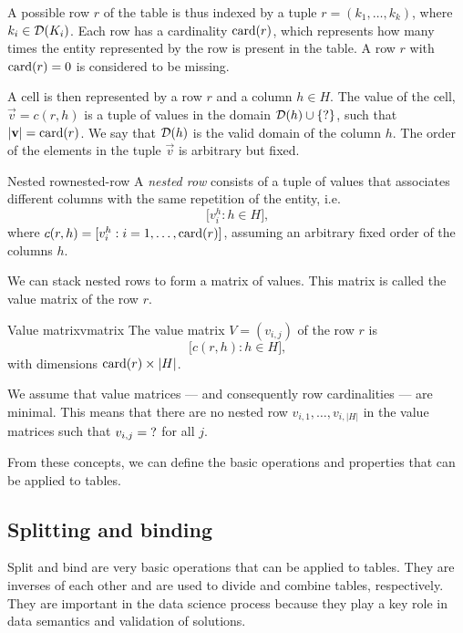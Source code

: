 A possible row $r$ of the table is thus indexed by a tuple $r = (k_1, \dots,
k_k)$, where $k_i \in \domainof{K_i}$.  Each row has a cardinality $\rowcard[r]$, which
represents how many times the entity represented by the row is present in the table.
A row $r$ with $\rowcard[r] = 0$ is considered to be missing.

A cell is then represented by a row $r$ and a column $h \in H$.  The value of the cell,
$\vec{v} = c(r, h)$ is a tuple of values in the domain $\domainof{h} \cup \{\missing\}$,
such that $|\vec{v}| = \rowcard[r]$.  We say that $\domainof{h}$ is the valid domain of
the column $h$.
The order of the elements in the tuple $\vec{v}$ is arbitrary but fixed.

\begin{defbox}{Nested row}{nested-row}
A \emph{nested
row} consists of a tuple of values that associates different columns with the same
repetition of the entity, i.e. \[
  \Big[ v^h_i : h \in H \Big]\text{,}
\]
where $c(r, h) = [v^h_i : i = 1, \dots, \rowcard[r]]$, assuming an arbitrary fixed order
of the columns $h$.
\end{defbox}

We can stack nested rows to form a matrix of values.  This matrix is called the value
matrix of the row $r$.

\begin{defbox}{Value matrix}{vmatrix}
The value matrix $V = (v_{i, j})$ of the row $r$ is \[
  \Big[ c(r, h) : h \in H \Big]\text{,}
\] with dimensions $\rowcard[r] \times |H|$.
\end{defbox}

We assume that value matrices --- and consequently row cardinalities --- are minimal. This
means that there are no nested row $v_{i, 1}, \dots, v_{i, |H|}$ in the value matrices
such that $v_{i, j} = \missing$ for all $j$.

From these concepts, we can define the basic operations and properties that can be applied
to tables.

\subsection{Splitting and binding}

Split and bind are very basic operations that can be applied to tables.  They are
inverses of each other and are used to divide and combine tables, respectively.
They are important in the data science process because they play a key role in
data semantics and validation of solutions.

